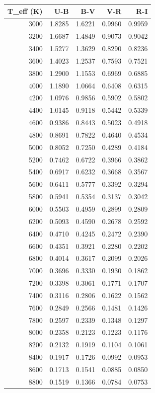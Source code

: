 \begin{tabular}{rrrrr}
\toprule
T_eff (K) & U-B & B-V & V-R & R-I \\
\midrule
3000 & 1.8285 & 1.6221 & 0.9960 & 0.9959 \\
3200 & 1.6687 & 1.4849 & 0.9073 & 0.9042 \\
3400 & 1.5277 & 1.3629 & 0.8290 & 0.8236 \\
3600 & 1.4023 & 1.2537 & 0.7593 & 0.7521 \\
3800 & 1.2900 & 1.1553 & 0.6969 & 0.6885 \\
4000 & 1.1890 & 1.0664 & 0.6408 & 0.6315 \\
4200 & 1.0976 & 0.9856 & 0.5902 & 0.5802 \\
4400 & 1.0145 & 0.9118 & 0.5442 & 0.5339 \\
4600 & 0.9386 & 0.8443 & 0.5023 & 0.4918 \\
4800 & 0.8691 & 0.7822 & 0.4640 & 0.4534 \\
5000 & 0.8052 & 0.7250 & 0.4289 & 0.4184 \\
5200 & 0.7462 & 0.6722 & 0.3966 & 0.3862 \\
5400 & 0.6917 & 0.6232 & 0.3668 & 0.3567 \\
5600 & 0.6411 & 0.5777 & 0.3392 & 0.3294 \\
5800 & 0.5941 & 0.5354 & 0.3137 & 0.3042 \\
6000 & 0.5503 & 0.4959 & 0.2899 & 0.2809 \\
6200 & 0.5093 & 0.4590 & 0.2678 & 0.2592 \\
6400 & 0.4710 & 0.4245 & 0.2472 & 0.2390 \\
6600 & 0.4351 & 0.3921 & 0.2280 & 0.2202 \\
6800 & 0.4014 & 0.3617 & 0.2099 & 0.2026 \\
7000 & 0.3696 & 0.3330 & 0.1930 & 0.1862 \\
7200 & 0.3398 & 0.3061 & 0.1771 & 0.1707 \\
7400 & 0.3116 & 0.2806 & 0.1622 & 0.1562 \\
7600 & 0.2849 & 0.2566 & 0.1481 & 0.1426 \\
7800 & 0.2597 & 0.2339 & 0.1348 & 0.1297 \\
8000 & 0.2358 & 0.2123 & 0.1223 & 0.1176 \\
8200 & 0.2132 & 0.1919 & 0.1104 & 0.1061 \\
8400 & 0.1917 & 0.1726 & 0.0992 & 0.0953 \\
8600 & 0.1713 & 0.1541 & 0.0885 & 0.0850 \\
8800 & 0.1519 & 0.1366 & 0.0784 & 0.0753 \\

\end{tabular}
